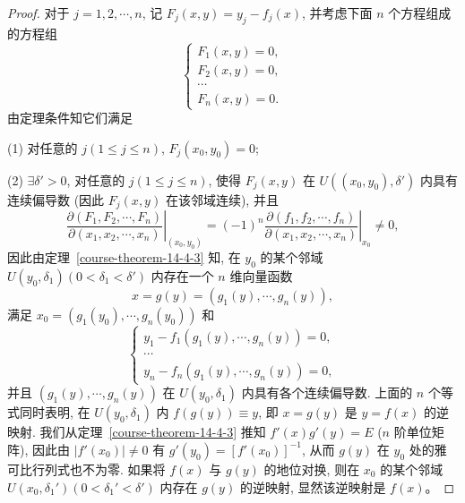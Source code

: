 \documentclass[UTF8,12pt,a4paper,fontset=fandol]{ctexart}
\begin{document}
\begin{proof}\quad 对于 $j=1,2,\cdots,n$, 记 $F_j(x,y)=y_j-f_j(x)$, 并考虑下面 $n$ 个方程组成的方程组
\[
  \begin{cases}
    F_1(x,y)=0,\\
    F_2(x,y)=0,\\
    \cdots\\
    F_n(x,y)=0.
  \end{cases}
\]
由定理条件知它们满足

\noindent (1) 对任意的 $j(1\leqslant j\leqslant n)$, $F_j(x_0,y_0)=0$;

\noindent (2) $\exists\delta'>0$, 对任意的 $j(1\leqslant j\leqslant n)$, 使得 $F_j(x,y)$ 在 $U((x_0,y_0),\delta')$ 内具有连续偏导数 (因此 $F_j(x,y)$ 在该邻域连续), 并且
\[
  \left.
  \frac{\partial(F_1,F_2,\cdots,F_n)}
       {\partial(x_1,x_2,\cdots,x_n)}
  \right|_{(x_0,y_0)}
  =
  (-1)^n
  \left.
  \frac{\partial(f_1,f_2,\cdots,f_n)}
       {\partial(x_1,x_2,\cdots,x_n)}
  \right|_{x_0}
  \ne0,
\]
因此由定理~\ref{course-theorem-14-4-3}  知, 在 $y_0$ 的某个邻域 $U(y_0,\delta_1)(0<\delta_1<\delta')$ 内存在一个 $n$ 维向量函数
\[
  x=g(y)=(g_1(y),\cdots,g_n(y)),
\]
满足 $x_0=(g_1(y_0),\cdots,g_n(y_0))$ 和
\[
  \begin{cases}
    y_1-f_1(g_1(y),\cdots,g_n(y))=0,\\
    \cdots\\
    y_n-f_n(g_1(y),\cdots,g_n(y))=0,
  \end{cases}
\]
并且 $(g_1(y),\cdots,g_n(y))$ 在 $U(y_0,\delta_1)$ 内具有各个连续偏导数. 上面的 $n$ 个等式同时表明, 在 $U(y_0,\delta_1)$ 内 $f(g(y))\equiv y$, 即 $x=g(y)$ 是 $y=f(x)$ 的逆映射. 我们从定理~\ref{course-theorem-14-4-3}  推知 $f'(x)g'(y)=E$ ($n$ 阶单位矩阵), 因此由 $|f'(x_0)|\ne0$ 有 $g'(y_0)=[f'(x_0)]^{-1}$, 从而 $g(y)$ 在 $y_0$ 处的雅可比行列式也不为零. 如果将 $f(x)$ 与 $g(y)$ 的地位对换, 则在 $x_0$ 的某个邻域 $U(x_0,\delta_1')(0<\delta_1'<\delta')$ 内存在 $g(y)$ 的逆映射, 显然该逆映射是 $f(x)$。


\end{proof}
\end{document}
